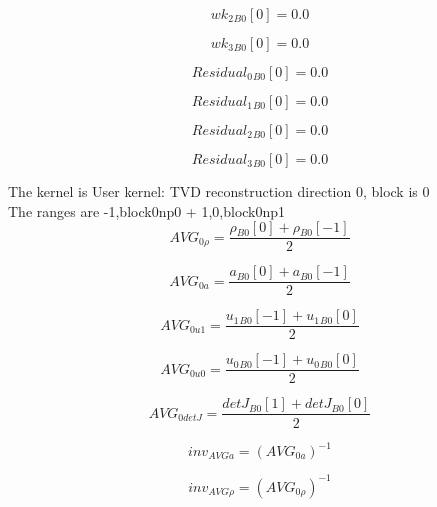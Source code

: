 \documentclass{article}
\begin{document}
\begin{dmath}{wk_{2}{_{B0}}}[{0}] = 0.0\end{dmath}

\begin{dmath}{wk_{3}{_{B0}}}[{0}] = 0.0\end{dmath}

\begin{dmath}{Residual_{0}{_{B0}}}[{0}] = 0.0\end{dmath}

\begin{dmath}{Residual_{1}{_{B0}}}[{0}] = 0.0\end{dmath}

\begin{dmath}{Residual_{2}{_{B0}}}[{0}] = 0.0\end{dmath}

\begin{dmath}{Residual_{3}{_{B0}}}[{0}] = 0.0\end{dmath}

\noindent The kernel is User kernel: TVD reconstruction direction 0, block is 0\\\noindent The ranges are -1,block0np0 + 1,0,block0np1\\\begin{dmath}AVG_{0 \rho} = \frac{{\rho{_{B0}}}[{0}] + {\rho{_{B0}}}[{-1}]}{2}\end{dmath}

\begin{dmath}AVG_{0 a} = \frac{{a{_{B0}}}[{0}] + {a{_{B0}}}[{-1}]}{2}\end{dmath}

\begin{dmath}AVG_{0 u1} = \frac{{u_{1}{_{B0}}}[{-1}] + {u_{1}{_{B0}}}[{0}]}{2}\end{dmath}

\begin{dmath}AVG_{0 u0} = \frac{{u_{0}{_{B0}}}[{-1}] + {u_{0}{_{B0}}}[{0}]}{2}\end{dmath}

\begin{dmath}AVG_{0 detJ} = \frac{{detJ{_{B0}}}[{1}] + {detJ{_{B0}}}[{0}]}{2}\end{dmath}

\begin{dmath}inv_{AVG a} = \left(AVG_{0 a} \right)^{-1}\end{dmath}

\begin{dmath}inv_{AVG \rho} = \left(AVG_{0 \rho} \right)^{-1}\end{dmath}
\end{document}
